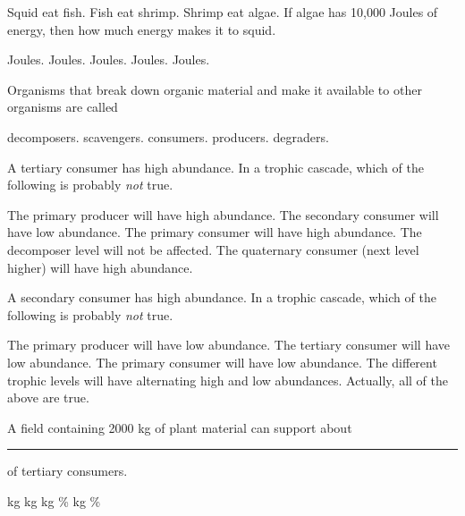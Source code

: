 \question
Squid eat fish.  Fish eat shrimp. Shrimp eat algae.  If algae has 10,000 Joules of energy, then how much energy makes it to squid.

\begin{choices}	
 Joules. %
 Joules. %
 Joules. %
 Joules. %
 Joules. %
\end{choices}


\question
Organisms that break down organic material and make it available to other organisms are called

\begin{choices}
\correctchoice decomposers. %
\choice scavengers. %
\choice consumers.  %
\choice producers. %
\choice degraders. %
\end{choices}


\question
A tertiary consumer has high abundance. In a trophic cascade, which of the following is probably \emph{not} true.
\begin{choices}
	\correctchoice The primary producer will have high abundance. %
	\choice The secondary consumer will have low abundance. %
	\choice The primary consumer will have high abundance. %
	\choice The decomposer level will not be affected. %
	\choice The quaternary consumer (next level higher) will have high abundance. %
\end{choices}

\question
A secondary consumer has high abundance. In a trophic cascade, which of the following is probably \emph{not} true.
\begin{choices}
\correctchoice The primary producer will have low abundance. %
\choice The tertiary consumer will have low abundance. %
\choice The primary consumer will have low abundance. %
\choice The different trophic levels will have alternating high and low abundances. %
\choice Actually, all of the above are true. %
\end{choices}

\question
A field containing 2000 kg of plant material can support about \rule{1in}{0.4pt} of tertiary consumers.

\begin{choices}
 kg %
 kg %
 kg %
\% %
 kg %
\% %
\end{choices}

